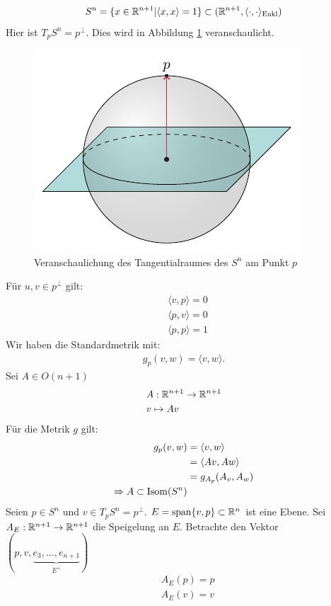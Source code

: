 \begin{bsp}
\begin{align}
S^n = \{ x \in \mathbb{R}^{n+1} \vert \langle x, x\rangle  = 1\} \subset (\mathbb{R}^{n+1}, \langle \cdot, \cdot \rangle_{\mathrm{Eukl}})
\end{align}
Hier ist $T_p S^n = p^\perp$.
Dies wird in Abbildung \ref{img:sphere_tangent_space} veranschaulicht.
\begin{figure}[H]
\centering
\includegraphics[width=0.4\linewidth]{figures/tikz/sphere_tangent_space.pdf}
\caption{Veranschaulichung des Tangentialraumes des $S^n$ am Punkt $p$}
\label{img:sphere_tangent_space}
\end{figure} 	
Für $u, v \in p^\perp$ gilt:
\begin{align*}
& \langle v, p \rangle = 0\\
& \langle p, v \rangle = 0\\
& \langle p, p \rangle = 1
\end{align*}
Wir haben die Standardmetrik mit:
\begin{align*}
g_p (v, w) = \langle v, w\rangle .
\end{align*}
Sei $A \in O(n+1)$
\begin{align*}
& A: \mathbb{R}^{n+1} \to \mathbb{R}^{n+1}\\
& v \mapsto A v
\end{align*}
Für die Metrik $g$ gilt:
\begin{align*}
g_p (v, w) &= \langle v, w\rangle\\
&= \langle Av, Aw \rangle\\ 
&= g_{A_p} (A_v, A_w)\\
\Rightarrow A \subset \operatorname{Isom} (S^n)
\end{align*}
Seien $p \in S^n$ und $v \in T_p S^n = p^\perp$.
$E = \mathrm{span} \{ v, p \} \subset \mathbb{R}^n$ ist eine Ebene.
Sei $A_E : \mathbb{R}^{n+1} \to \mathbb{R}^{n+1}$ die Speigelung an $E$.
Betrachte den Vektor $(p, v, \underbrace{e_3, \dots, e_{n+1}}_{E^\perp})$
\begin{align*}
&A_E (p) = p\\
& A_E (v) = v\\

\end{align*}
\end{bsp}
